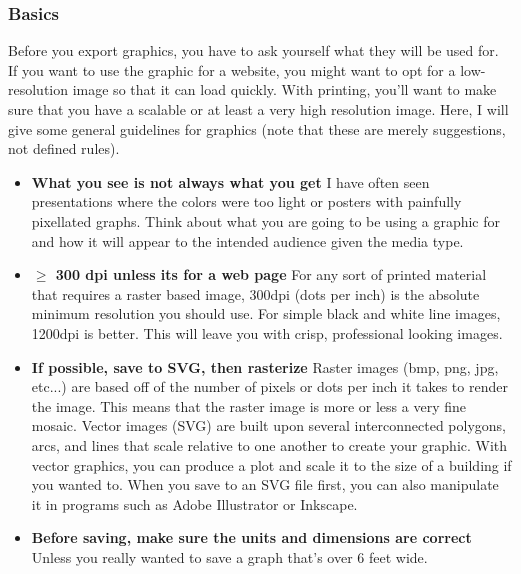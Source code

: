 \documentclass[letterpaper]{article}
\newcommand{\tab}{\hspace*{1em}}
\begin{document}
\subsubsection{Basics}\label{appendix:graphics:basics}
\tab\tab Before you export graphics, you have to ask yourself what they will be used for. If you want to use the graphic for a website, you might want to opt for a low-resolution image so that it can load quickly. With printing, you'll want to make sure that you have a scalable or at least a very high resolution image. Here, I will give some general guidelines for graphics (note that these are merely suggestions, not defined rules).
\begin{itemize}
  \item \textbf{What you see is not always what you get} I have often seen presentations where the colors were too light or posters with painfully pixellated graphs. Think about what you are going to be using a graphic for and how it will appear to the intended audience given the media type.
  \item \textbf{$\geq$ 300 dpi unless its for a web page} For any sort of printed material that requires a raster based image, 300dpi (dots per inch) is the absolute minimum resolution you should use. For simple black and white line images, 1200dpi is better. This will leave you with crisp, professional looking images.
  \item \textbf{If possible, save to SVG, then rasterize} Raster images (bmp, png, jpg, etc...) are based off of the number of pixels or dots per inch it takes to render the image. This means that the raster image is more or less a very fine mosaic. Vector images (SVG) are built upon several interconnected polygons, arcs, and lines that scale relative to one another to create your graphic. With vector graphics, you can produce a plot and scale it to the size of a building if you wanted to. When you save to an SVG file first, you can also manipulate it in programs such as Adobe Illustrator or Inkscape. 
  \item \textbf{Before saving, make sure the units and dimensions are correct} Unless you really wanted to save a graph that's over 6 feet wide.
\end{itemize}
\end{document}
